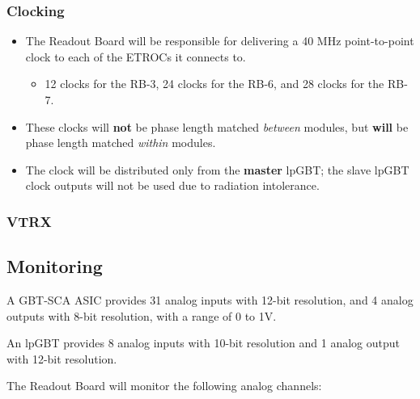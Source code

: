 \documentclass[11pt]{article}
\begin{document}
\subsubsection{Clocking}
\label{sec:org661faca}
\begin{itemize}
\item The Readout Board will be responsible for delivering a 40 MHz point-to-point clock to each of the ETROCs it connects to.
\begin{itemize}
\item 12 clocks for the RB-3, 24 clocks for the RB-6, and 28 clocks for the RB-7.
\end{itemize}
\item These clocks will \textbf{not} be phase length matched \emph{between} modules, but \textbf{will} be phase length matched \emph{within} modules.
\item The clock will be distributed only from the \textbf{master} lpGBT; the slave lpGBT clock outputs will not be used due to radiation intolerance.
\end{itemize}
\subsubsection{VTRX}
\label{sec:orgf991482}
\subsection{Monitoring}
\label{sec:orgd725b87}

A GBT-SCA ASIC provides 31 analog inputs with 12-bit resolution, and 4 analog outputs with 8-bit resolution, with a range of 0 to 1V.

An lpGBT provides 8 analog inputs with 10-bit resolution and 1 analog output with 12-bit resolution.

The Readout Board will monitor the following analog channels:
\end{document}
